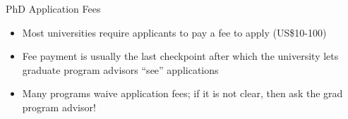 \begin{frame}[fragile]{PhD Application Fees}
    \begin{itemize}
        \item Most universities require applicants to pay a fee to apply (US\$10-100)
        \item Fee payment is usually the last checkpoint after which the university lets graduate program advisors ``see'' applications
        \item Many programs waive application fees; if it is not clear, then ask the grad program advisor!
    \end{itemize}
\end{frame}

